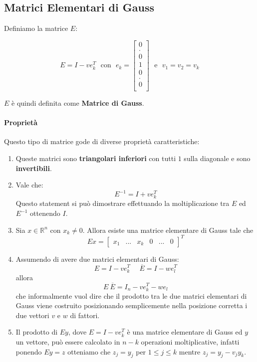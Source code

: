 \documentclass{article}
\begin{document}
\subsection{Matrici Elementari di Gauss}

Definiamo la matrice $E$:

\[ E = I -ve^{T}_{k} \:\:\: \text{con} \:\:\: e_{k} = \begin{bmatrix}
    0 \\
    . \\
    0 \\
    1 \\
    0 \\
    . \\
    0 \\
    
\end{bmatrix}
\:\:\: \text{e} \:\:\: 
v_{1} = v_{2} = v_{k}
\]

$E$ è quindi definita come \textbf{Matrice di Gauss}.

\paragraph{Proprietà} Questo tipo di matrice gode di diverse proprietà caratteristiche:

\begin{enumerate}
    \item Queste matrici sono \textbf{triangolari inferiori} con tutti $1$ sulla diagonale e sono \textbf{invertibili}.
    \item Vale che:
    \vspace*{5px}
    \[ E^{-1} = I + ve^T_k \]
    \vspace*{5px}
    Questo statement si può dimostrare effettuando la moltiplicazione tra $E$ ed $E^{-1}$ ottenendo $I$.
    \item Sia $x \in \mathbb{R}^{n}$ con $x_{k} \neq 0$. Allora esiste una matrice elementare di Gauss tale che
    \[ Ex = {\begin{bmatrix}
        x_{1} & ... & x_{k} & 0 & ... & 0
    \end{bmatrix}}^{T} \]
    \newpage
    \item Assumendo di avere due matrici elementari di Gauss:
    \[ \boxed{E = I - ve^T_k} \:\:\:\:\:\: \boxed{\overline{E} = I - we^T_l} \]
    allora
    \[ \boxed{E \: \overline{E} = I_{n} - ve_{k}^{T} - we_{l}} \]
    che informalmente vuol dire che il prodotto tra le due matrici elementari di Gauss viene costruito posizionando
    semplicemente nella posizione corretta i due vettori $v$ e $w$ di fattori.
    \item Il prodotto di $Ey$, dove $E = I - ve_{k}^{T}$ è una matrice elementare di Gauss ed $y$ un vettore, può essere calcolato in $n-k$
    operazioni moltiplicative, infatti ponendo $Ey = z$ otteniamo che $z_{j} = y_{j}$ per $1 \leq j \leq k$ mentre $z_{j} = y_{j} - v_{j}y_{k}$.
\end{enumerate}
\end{document}
